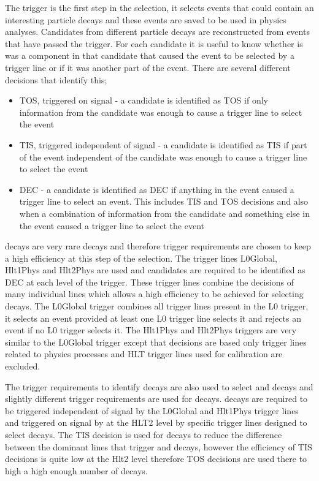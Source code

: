 The trigger is the first step in the selection, it selects events that could contain an interesting particle decays and these events are saved to be used in physics analyses. Candidates from different particle decays are reconstructed from events that have passed the trigger. For each candidate it is useful to know whether is was a component in that candidate that caused the event to be selected by a trigger line or if it was another part of the event. There are several different decisions that identify this;
\begin{itemize}
\item TOS, triggered on signal - a candidate is identified as TOS if only information from the candidate was enough to cause a trigger line to select the event
\item TIS, triggered independent of signal - a candidate is identified as TIS if part of the event independent of the candidate was enough to cause a trigger line to select the event
\item DEC - a candidate is identified as DEC if anything in the event caused a trigger line to select an event. This includes TIS and TOS decisions and also when a combination of information from the candidate and something else in the event caused a trigger line to select the event
\end{itemize}

\bsmumu decays are very rare decays and therefore trigger requirements are chosen to keep a high efficiency at this step of the selection. The trigger lines L0Global, Hlt1Phys and Hlt2Phys are used and candidates are required to be identified as DEC at each level of the trigger. These trigger lines combine the decisions of many individual lines which allows a high efficiency to be achieved for selecting \bsmumu decays. The L0Global trigger combines all trigger lines present in the L0 trigger, it selects an event provided at least one L0 trigger line selects it and rejects an event if no L0 trigger selects it. The Hlt1Phys and Hlt2Phys triggers are very similar to the L0Global trigger except that decisions are based only trigger lines related to physics processes and HLT trigger lines used for calibration are excluded.

The trigger requirements to identify \bmumu decays are also used to select \bujpsik and \bsjpsiphi decays and slightly different trigger requirements are used for \bhh decays. \bhh decays are required to be triggered independent of signal by the L0Global and Hlt1Phys trigger lines and triggered on signal by at the HLT2 level by specific trigger lines designed to select \bhh decays. The TIS decision is used for \bhh decays to reduce the difference between the dominant lines that trigger \bhh and \bmumu decays, however the efficiency of TIS decisions is quite low at the Hlt2 level therefore TOS decisions are used there to high a high enough number of decays.

